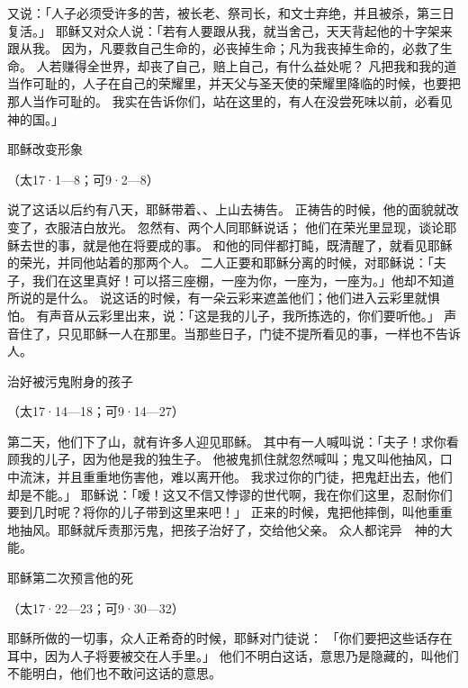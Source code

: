 {又说：「人子必须受许多的苦，被长老、祭司长，和文士弃绝，并且被杀，第三日复活。」
耶稣又对众人说：「若有人要跟从我，就当舍己，天天背起他的十字架来跟从我。
因为，凡要救自己生命的，必丧掉生命；凡为我丧掉生命的，必救了生命。
人若赚得全世界，却丧了自己，赔上自己，有什么益处呢？
凡把我和我的道当作可耻的，人子在自己的荣耀里，并天父与圣天使的荣耀里降临的时候，也要把那人当作可耻的。
我实在告诉你们，站在这里的，有人在没尝死味以前，必看见　神的国。」
\par }{\SH 耶稣改变形象
\par }{\R （太17·1—8；可9·2—8）
\par }{\PP {}说了这话以后约有八天，耶稣带着{}、{}、{}上山去祷告。
正祷告的时候，他的面貌就改变了，衣服洁白放光。
忽然有{}、{}两个人同耶稣说话；
他们在荣光里显现，谈论耶稣去世的事，就是他在{}将要成的事。
和他的同伴都打盹，既清醒了，就看见耶稣的荣光，并同他站着的那两个人。
二人正要和耶稣分离的时候，{}对耶稣说：「夫子，我们在这里真好！可以搭三座棚，一座为你，一座为{}，一座为{}。」他却不知道所说的是什么。
说这话的时候，有一朵云彩来遮盖他们；他们进入云彩里就惧怕。
有声音从云彩里出来，说：「这是我的儿子，我所拣选的，你们要听他。」
声音住了，只见耶稣一人在那里。当那些日子，门徒不提所看见的事，一样也不告诉人。
\par }{\SH 治好被污鬼附身的孩子
\par }{\R （太17·14—18；可9·14—27）
\par }{\PP {}第二天，他们下了山，就有许多人迎见耶稣。
其中有一人喊叫说：「夫子！求你看顾我的儿子，因为他是我的独生子。
他被鬼抓住就忽然喊叫；鬼又叫他抽风，口中流沫，并且重重地伤害他，难以离开他。
我求过你的门徒，把鬼赶出去，他们却是不能。」
耶稣说：「嗳！这又不信又悖谬的世代啊，我在你们这里，忍耐你们要到几时呢？将你的儿子带到这里来吧！」
正来的时候，鬼把他摔倒，叫他重重地抽风。耶稣就斥责那污鬼，把孩子治好了，交给他父亲。
众人都诧异　神的大能。
\par }{\SH 耶稣第二次预言他的死
\par }{\R （太17·22—23；可9·30—32）
\par }{\PP 耶稣所做的一切事，众人正希奇的时候，耶稣对门徒说：
「你们要把这些话存在耳中，因为人子将要被交在人手里。」
他们不明白这话，意思乃是隐藏的，叫他们不能明白，他们也不敢问这话的意思。
}

